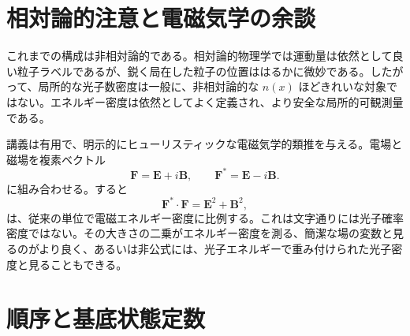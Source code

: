 \section{相対論的注意と電磁気学の余談}

これまでの構成は非相対論的である。相対論的物理学では運動量は依然として良い粒子ラベルであるが、鋭く局在した粒子の位置ははるかに微妙である。したがって、局所的な光子数密度は一般に、非相対論的な \(n(x)\) ほどきれいな対象ではない。エネルギー密度は依然としてよく定義され、より安全な局所的可観測量である。

講義は有用で、明示的にヒューリスティックな電磁気学的類推を与える。電場と磁場を複素ベクトル
\begin{equation}
\mathbf F=\mathbf E+i\mathbf B,
\qquad
\mathbf F^*=\mathbf E-i\mathbf B.
\label{eq:l07-riemann-silberstein}
\end{equation}
に組み合わせる。すると
\begin{equation}
\mathbf F^*\mathbin{\cdot}\mathbf F
=\mathbf E^2+\mathbf B^2,
\label{eq:l07-em-density}
\end{equation}
は、従来の単位で電磁エネルギー密度に比例する。これは文字通りには光子確率密度ではない。その大きさの二乗がエネルギー密度を測る、簡潔な場の変数と見るのがより良く、あるいは非公式には、光子エネルギーで重み付けられた光子密度と見ることもできる。

\begin{classroomqa}
\end{classroomqa}

\begin{classroomqa}
\end{classroomqa}

\section{順序と基底状態定数}

